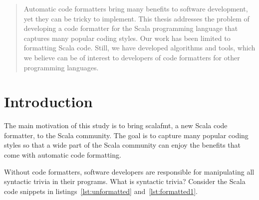 \documentclass[11pt,a4paper]{article}
\begin{document}








\begin{abstract}
  Automatic code formatters bring many benefits to software development, yet they can be tricky to implement.
  This thesis addresses the problem of developing a code formatter for the
  Scala programming language that captures many popular coding styles.
  Our work has been limited to formatting Scala code.
  Still, we have developed algorithms and tools,
  which we believe can be of interest to developers of code formatters for other programming languages.
\end{abstract}
\tableofcontents
% 
\pagebreak
\section{Introduction} %
\label{sec:Introduction}
\lstset{style=scala}
The main motivation of this study is to bring scalafmt, a new Scala code formatter, to the Scala community.
The goal is to capture many popular coding styles so that a wide part of the Scala community can enjoy the benefits that come with automatic code formatting.

Without code formatters, software developers are responsible for manipulating all syntactic trivia in their programs.
What is syntactic trivia?
Consider the Scala code snippets in listings~\ref{lst:unformatted} and~\ref{lst:formatted1}.
\end{document}
